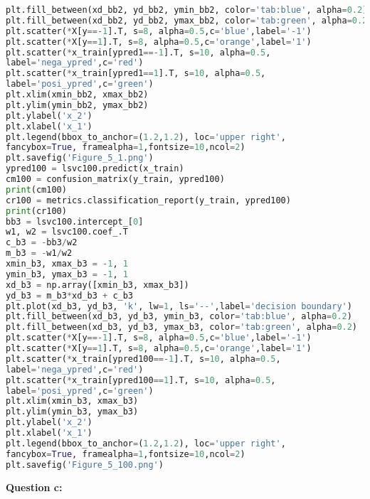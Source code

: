 \documentclass[10pt]{article}
\begin{document}
\begin{lstlisting}[language=Python]
plt.fill_between(xd_bb2, yd_bb2, ymin_bb2, color='tab:blue', alpha=0.2)
plt.fill_between(xd_bb2, yd_bb2, ymax_bb2, color='tab:green', alpha=0.2)
plt.scatter(*X[y==-1].T, s=8, alpha=0.5,c='blue',label='-1')
plt.scatter(*X[y==1].T, s=8, alpha=0.5,c='orange',label='1')
plt.scatter(*x_train[ypred1==-1].T, s=10, alpha=0.5, 
label='nega_ypred',c='red')
plt.scatter(*x_train[ypred1==1].T, s=10, alpha=0.5,
label='posi_ypred',c='green')
plt.xlim(xmin_bb2, xmax_bb2)
plt.ylim(ymin_bb2, ymax_bb2)
plt.ylabel('x_2')
plt.xlabel('x_1')
plt.legend(bbox_to_anchor=(1.2,1.2), loc='upper right', 
fancybox=True, framealpha=1,fontsize=10,ncol=2)
plt.savefig('Figure_5_1.png')
ypred100 = lsvc100.predict(x_train)
cm100 = confusion_matrix(y_train, ypred100)
print(cm100)
cr100 = metrics.classification_report(y_train, ypred100)
print(cr100)
bb3 = lsvc100.intercept_[0]
w1, w2 = lsvc100.coef_.T
c_b3 = -bb3/w2
m_b3 = -w1/w2
xmin_b3, xmax_b3 = -1, 1
ymin_b3, ymax_b3 = -1, 1
xd_b3 = np.array([xmin_b3, xmax_b3])
yd_b3 = m_b3*xd_b3 + c_b3
plt.plot(xd_b3, yd_b3, 'k', lw=1, ls='--',label='decision boundary')
plt.fill_between(xd_b3, yd_b3, ymin_b3, color='tab:blue', alpha=0.2)
plt.fill_between(xd_b3, yd_b3, ymax_b3, color='tab:green', alpha=0.2)
plt.scatter(*X[y==-1].T, s=8, alpha=0.5,c='blue',label='-1')
plt.scatter(*X[y==1].T, s=8, alpha=0.5,c='orange',label='1')
plt.scatter(*x_train[ypred100==-1].T, s=10, alpha=0.5, 
label='nega_ypred',c='red')
plt.scatter(*x_train[ypred100==1].T, s=10, alpha=0.5,
label='posi_ypred',c='green')
plt.xlim(xmin_b3, xmax_b3)
plt.ylim(ymin_b3, ymax_b3)
plt.ylabel('x_2')
plt.xlabel('x_1')
plt.legend(bbox_to_anchor=(1.2,1.2), loc='upper right', 
fancybox=True, framealpha=1,fontsize=10,ncol=2)
plt.savefig('Figure_5_100.png')
\end{lstlisting}
\textbf{Question c:}
\end{document}
